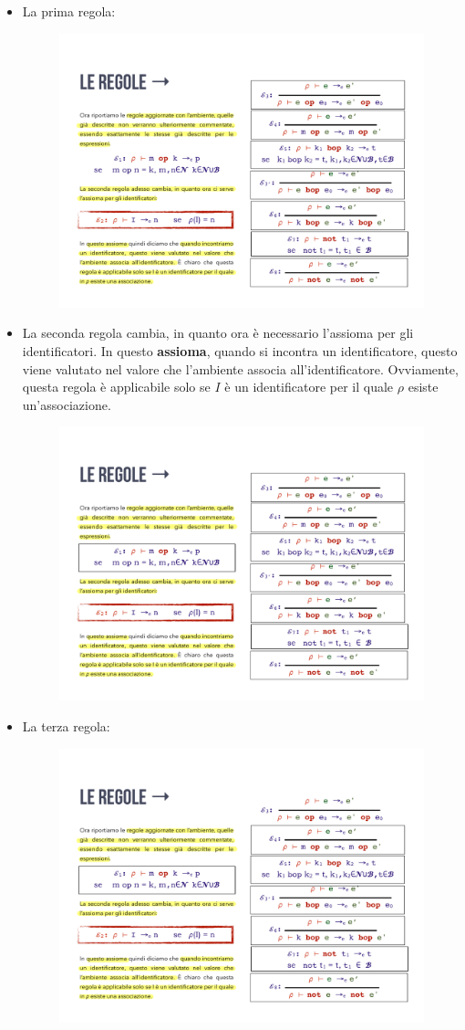 \documentclass[a4paper]{article}
\begin{document}
	\begin{itemize}
		\item La prima regola:
		\begin{figure}[!htp]
			\centering
			\includegraphics[width=.6\textwidth]{img/regola_espressione-1.pdf}
		\end{figure}
		
		\item La seconda regola cambia, in quanto ora è necessario l'assioma per gli identificatori. In questo \textbf{assioma}, quando si incontra un identificatore, questo viene valutato nel valore che l'ambiente associa all'identificatore. Ovviamente, questa regola è applicabile solo se $I$ è un identificatore per il quale $\rho$ esiste un'associazione.
		\begin{figure}[!htp]
			\centering
			\includegraphics[width=.6\textwidth]{img/regola_espressione-2.pdf}
		\end{figure}
		
		\item La terza regola:
		\begin{figure}[!htp]
			\centering
			\includegraphics[width=.6\textwidth]{img/regola_espressione-3.pdf}
		\end{figure}
		

\end{itemize}
\end{document}
